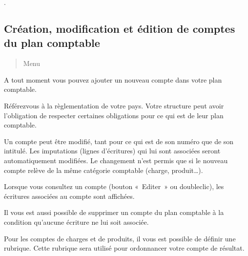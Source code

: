 \documentclass[a4paper,10pt,oneside,french]{sphinxmanual}
\begin{document}
\sphinxAtStartPar
{}
.


\subsection{Création, modification et édition de comptes du plan comptable}
\label{\detokenize{accounting/fiscalyear:creation-modification-et-edition-de-comptes-du-plan-comptable}}\begin{quote}

\sphinxAtStartPar
Menu 
\end{quote}

\sphinxAtStartPar
A tout moment vous pouvez ajouter un nouveau compte dans votre plan comptable.
\begin{quote}

\noindent{}
\end{quote}

\sphinxAtStartPar
Référez\sphinxhyphen{}vous à la règlementation de votre pays. Votre structure peut avoir l’obligation de respecter certaines obligations pour ce qui est de leur plan comptable.

\sphinxAtStartPar
Un compte peut être modifié, tant pour ce qui est de son numéro que de son intitulé. Les imputations (lignes d’écritures) qui lui sont associées seront automatiquement modifiées. Le changement n’est permis que si le nouveau compte relève de la même catégorie comptable (charge, produit…).

\sphinxAtStartPar
Lorsque vous consultez un compte (bouton « Editer » ou double\sphinxhyphen{}clic), les écritures associées au compte sont affichées.
\begin{quote}

\noindent{}
\end{quote}

\sphinxAtStartPar
Il vous est aussi possible de supprimer un compte du plan comptable à la condition qu’aucune écriture ne lui soit associée.

\sphinxAtStartPar
{} Pour les comptes de charges et de produits, il vous est possible de définir une rubrique.
Cette rubrique sera utilisé pour ordonnancer votre compte de résultat.
\end{document}
